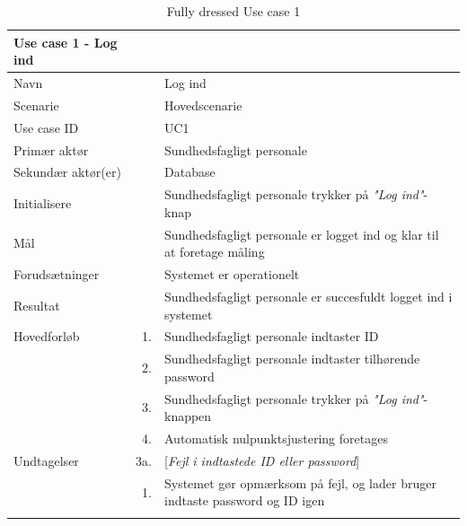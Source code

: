 \begin{longtabu} to 
\toprule
    {\large \textbf{Use case 1 - Log ind}} && \\
    \toprule
    Navn &&    Log ind\\
    Scenarie &&    Hovedscenarie\\
    Use case ID &&    UC1\\
    Primær aktør &&    Sundhedsfagligt personale\\
    Sekundær aktør(er) &&    Database\\
    Initialisere &&    Sundhedsfagligt personale trykker på \textit{"Log ind"}-knap\\
    Mål &&    Sundhedsfagligt personale er logget ind og klar til at foretage måling\\
    Forudsætninger &&    Systemet er operationelt\\
    Resultat &&    Sundhedsfagligt personale er succesfuldt logget ind i systemet\\
    \toprule
    
    Hovedforløb &    1. &    Sundhedsfagligt personale indtaster ID\\[-1ex]
                &    2. &    Sundhedsfagligt personale indtaster tilhørende password\\[-1ex]
                &    3. &    Sundhedsfagligt personale trykker på \textit{"Log ind"}-knappen\\[-1ex]
                &	4.	&	Automatisk nulpunktsjustering foretages\\[-1ex]
                            
    \toprule
    Undtagelser &    3a. & [\textit{Fejl i indtastede ID eller password}] \\[-1ex]
    & 1. &  Systemet gør opmærksom på fejl, og lader bruger indtaste password og ID igen\\[-1ex]
                \toprule
   
\caption{Fully dressed Use case 1}
\label{UC1}
\end{longtabu}
\newpage


